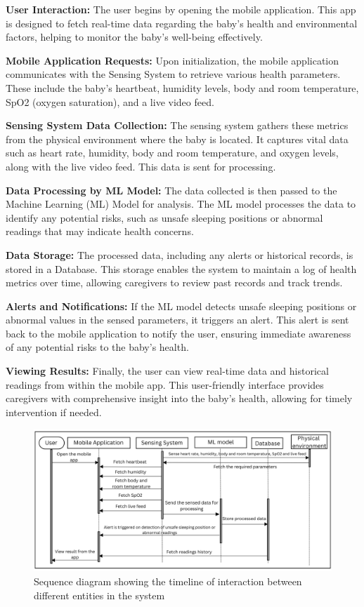 \documentclass[12pt,a4paper]{report}
\begin{document}
\textbf{User Interaction:} The user begins by opening the mobile application. This app is designed to fetch real-time data regarding the baby’s health and environmental factors, helping to monitor the baby’s well-being effectively.

\textbf{Mobile Application Requests:} Upon initialization, the mobile application communicates with the Sensing System to retrieve various health parameters. These include the baby’s heartbeat, humidity levels, body and room temperature, SpO2 (oxygen saturation), and a live video feed.

\textbf{Sensing System Data Collection:} The sensing system gathers these metrics from the physical environment where the baby is located. It captures vital data such as heart rate, humidity, body and room temperature, and oxygen levels, along with the live video feed. This data is sent for processing.

\textbf{Data Processing by ML Model:} The data collected is then passed to the Machine Learning (ML) Model for analysis. The ML model processes the data to identify any potential risks, such as unsafe sleeping positions or abnormal readings that may indicate health concerns.

\textbf{Data Storage:} The processed data, including any alerts or historical records, is stored in a Database. This storage enables the system to maintain a log of health metrics over time, allowing caregivers to review past records and track trends.

\textbf{Alerts and Notifications:} If the ML model detects unsafe sleeping positions or abnormal values in the sensed parameters, it triggers an alert. This alert is sent back to the mobile application to notify the user, ensuring immediate awareness of any potential risks to the baby’s health.

\textbf{Viewing Results:} Finally, the user can view real-time data and historical readings from within the mobile app. This user-friendly interface provides caregivers with comprehensive insight into the baby’s health, allowing for timely intervention if needed.

\begin{figure}[hbtp]
  \centering
  \includegraphics[scale=0.27]{./pic/seq.png}
  \caption{Sequence diagram showing the timeline of interaction between different entities in the system}
  \label{fig:sequence}
\end{figure}
\end{document}
